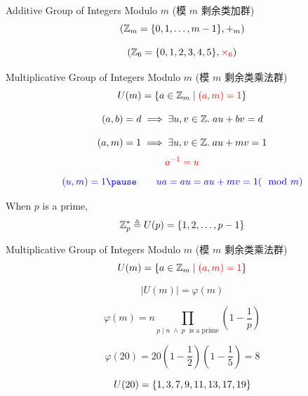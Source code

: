 \begin{frame}
  \begin{exampleblock}{Additive Group of Integers Modulo $m$ (模 $m$ 剩余类加群)}
    \[
      (\mathbb{Z}_{m} = \{0, 1, \dots, m-1\}, +_{m})
    \]
  \end{exampleblock}

  \pause
  \vspace{0.30cm}
  \[
    (\mathbb{Z}_{6} = \{0, 1, 2, 3, 4, 5\}, \textcolor{red}{\times_{6}})
  \]
\end{frame}

\begin{frame}
  \begin{exampleblock}{Multiplicative Group of Integers Modulo $m$ (模 $m$ 剩余类乘法群)}
    \[
      U(m) = \{a \in \mathbb{Z}_{m} \mid \textcolor{red}{(a, m) = 1}\}
    \]
  \end{exampleblock}

  \pause
  \vspace{0.60cm}
  \begin{theorem}
    \[
      (a, b) = d \implies \exists u, v \in \mathbb{Z}.\; au + bv = d
    \]
  \end{theorem}

  \pause
  \[
    (a, m) = 1 \implies \exists u, v \in \mathbb{Z}.\; au + mv = 1
  \]
  \pause
  \[
    \textcolor{red}{a^{-1} = u}
  \]
  \pause
  \[
    \blue{(u, m) = 1 \pause\qquad ua = au = au + mv = 1 (\mod{m})}
  \]
\end{frame}

\begin{frame}{}
  \begin{center}
    When $p$ is a prime,
    \[
      \mathbb{Z}^{\ast}_{p} \triangleq U(p) = \{1, 2, \dots, p-1\}
    \]
  \end{center}
\end{frame}

\begin{frame}
  \begin{exampleblock}{Multiplicative Group of Integers Modulo $m$ (模 $m$ 剩余类乘法群)}
    \[
      U(m) = \{a \in \mathbb{Z}_{m} \mid \textcolor{red}{(a, m) = 1}\}
    \]
  \end{exampleblock}

  \pause
  \[
    \big\lvert U(m) \big\rvert = \varphi(m)
  \]

  \pause
  \vspace{0.50cm}
  \begin{definition}
    \[
      \varphi(m) = n \prod_{p \mid n \;\land\; p\; \text{ is a prime}}
        \left(1 - \frac{1}{p} \right)
    \]
  \end{definition}

  \pause
  \[
    \varphi(20) = 20 (1 - \frac{1}{2}) (1 - \frac{1}{5}) = 8
  \]

  \pause
  \[
    U(20) = \{1, 3, 7, 9, 11, 13, 17, 19\}
  \]
\end{frame}


